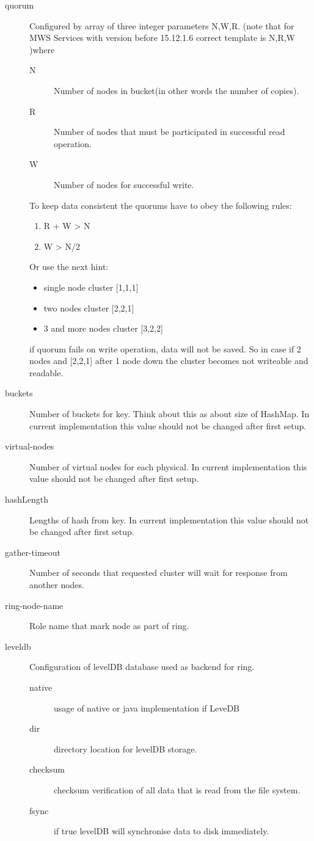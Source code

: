 \begin{description}
  \item[quorum] Configured by array of three integer parameters N,W,R. (note that for MWS Services with version before 15.12.1.6 correct template is N,R,W )where
  \begin{description}
    \item[N] Number of nodes in bucket(in other words the number of copies).
    \item[R] Number of nodes that must  be participated in successful read operation.
    \item[W] Number of nodes for successful write.
  \end{description}
  To keep data consistent the quorums have to obey the following rules:
  \begin{enumerate}
    \item R + W > N
    \item W > N/2
  \end{enumerate}
  Or use the next hint:
  \begin{itemize}
    \item single node cluster [1,1,1]
    \item two nodes cluster [2,2,1]
    \item 3 and more nodes cluster [3,2,2]
  \end{itemize}
  if quorum fails on write operation, data will not be saved. So in case if 2 nodes and [2,2,1] after 1 node down the cluster becomes not writeable and readable.
  \item[buckets] Number of buckets for key. Think about this as about size of HashMap. In current implementation this value should not be changed after first setup.
  \item[virtual-nodes] Number of virtual nodes for each physical. In current implementation this value should not be changed after first setup.
  \item[hashLength] Lengths of hash from key. In current implementation this value should not be changed after first setup.
  \item[gather-timeout] Number of seconds that requested cluster will wait for response from another nodes.
  \item[ring-node-name] Role name that mark node as part of ring.
  \item[leveldb] Configuration of levelDB database used as backend for ring.
  \begin{description}
    \item[native] usage of native or java implementation if LeveDB
    \item[dir] directory location for levelDB storage.
    \item[checksum] checksum verification of all data that is read from the file system.
    \item[fsync] if true levelDB will synchronise data to disk immediately.
  \end{description}
\end{description}

